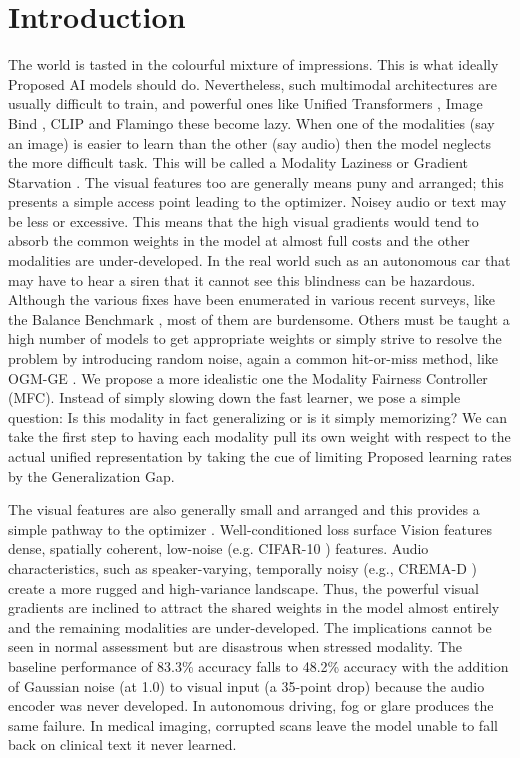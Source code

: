 \documentclass[preprint,a4paper, 10pt, 5p]{elsarticle}
\begin{document}
\section{Introduction}
The world is tasted in the colourful mixture of impressions. This is what ideally Proposed AI models should do. Nevertheless, such multimodal architectures are usually difficult to train, and powerful ones like Unified Transformers \cite{zhang2023meta}, Image Bind \cite{girdhar2023imagebind}, CLIP \cite{radford2021learning} and Flamingo \cite{alayrac2022flamingo} these become lazy. When one of the modalities (say an image) is easier to learn than the other (say audio) then the model neglects the more difficult task. This will be called a Modality Laziness or Gradient Starvation \cite{pezeshki2021gradient}. The visual features too are generally means puny and arranged; this presents a simple access point leading to the optimizer. Noisey audio or text may be less or excessive. This means that the high visual gradients would tend to absorb the common weights in the model at almost full costs and the other modalities are under-developed. In the real world such as an autonomous car that may have to hear a siren that it cannot see this blindness can be hazardous. Although the various fixes have been enumerated in various recent surveys, like the Balance Benchmark \cite{xu2025balancebenchmark}, most of them are burdensome. Others must be taught a high number of models to get appropriate weights or simply strive to resolve the problem by introducing random noise, again a common hit-or-miss method, like OGM-GE \cite{peng2022balanced}. We propose a more idealistic one the Modality Fairness Controller (MFC). Instead of simply slowing down the fast learner, we pose a simple question: Is this modality in fact generalizing or is it simply memorizing? We can take the first step to having each modality pull its own weight with respect to the actual unified representation by taking the cue of limiting Proposed learning rates by the Generalization Gap.

The visual features are also generally small and arranged and this provides a simple pathway to the optimizer \cite{pezeshki2021gradient}. Well-conditioned loss surface Vision features dense, spatially coherent, low-noise (e.g. CIFAR-10 \cite{krizhevsky2009learning}) features. Audio characteristics, such as speaker-varying, temporally noisy (e.g., CREMA-D \cite{cao2014crema}) create a more rugged and high-variance landscape. Thus, the powerful visual gradients are inclined to attract the shared weights in the model almost entirely and the remaining modalities are under-developed. The implications cannot be seen in normal assessment but are disastrous when stressed modality. The baseline performance of 83.3\% accuracy falls to 48.2\% accuracy with the addition of Gaussian noise (at 1.0) to visual input (a 35-point drop) because the audio encoder was never developed. In autonomous driving, fog or glare produces the same failure. In medical imaging, corrupted scans leave the model unable to fall back on clinical text it never learned.
\end{document}
